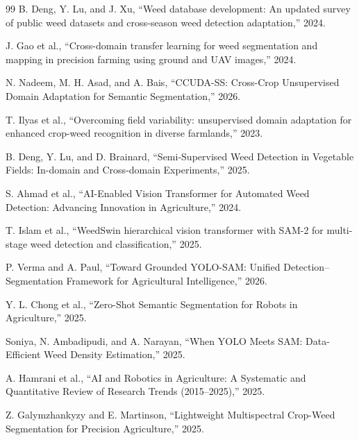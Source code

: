 \begin{singlespace}
\begin{thebibliography}{99}
B. Deng, Y. Lu, and J. Xu, ``Weed database development: An updated survey of public weed datasets and cross-season weed detection adaptation,'' 2024.

J. Gao et al., ``Cross-domain transfer learning for weed segmentation and mapping in precision farming using ground and UAV images,'' 2024.

N. Nadeem, M. H. Asad, and A. Bais, ``CCUDA-SS: Cross-Crop Unsupervised Domain Adaptation for Semantic Segmentation,'' 2026.

T. Ilyas et al., ``Overcoming field variability: unsupervised domain adaptation for enhanced crop-weed recognition in diverse farmlands,'' 2023.

B. Deng, Y. Lu, and D. Brainard, ``Semi-Supervised Weed Detection in Vegetable Fields: In-domain and Cross-domain Experiments,'' 2025.

S. Ahmad et al., ``AI-Enabled Vision Transformer for Automated Weed Detection: Advancing Innovation in Agriculture,'' 2024.

T. Islam et al., ``WeedSwin hierarchical vision transformer with SAM-2 for multi-stage weed detection and classification,'' 2025.

P. Verma and A. Paul, ``Toward Grounded YOLO-SAM: Unified Detection–Segmentation Framework for Agricultural Intelligence,'' 2026.

Y. L. Chong et al., ``Zero-Shot Semantic Segmentation for Robots in Agriculture,'' 2025.

Soniya, N. Ambadipudi, and A. Narayan, ``When YOLO Meets SAM: Data-Efficient Weed Density Estimation,'' 2025.

A. Hamrani et al., ``AI and Robotics in Agriculture: A Systematic and Quantitative Review of Research Trends (2015–2025),'' 2025.

Z. Galymzhankyzy and E. Martinson, ``Lightweight Multispectral Crop-Weed Segmentation for Precision Agriculture,'' 2025.


\end{thebibliography}
\end{singlespace}
